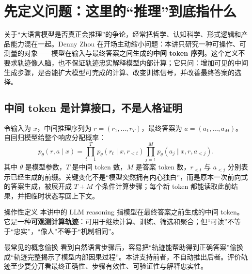 \section{先定义问题：这里的“推理”到底指什么}

关于“大语言模型是否真正会推理”的争论，经常把哲学、认知科学、形式逻辑和产品能力混在一起。Denny Zhou 在开场主动缩小问题：本讲只研究一种可操作、可测量的对象——模型在输入与最终答案之间生成的\textbf{中间 token 序列}。这个定义不要求轨迹像人脑，也不保证轨迹忠实解释模型内部计算；它只问：增加可见的中间生成步骤，是否能扩大模型可完成的计算、改变训练信号，并改善最终答案的选择。



\subsection{中间 token 是计算接口，不是人格证明}

令输入为 $x$，中间推理序列为 $r=(r_1,\ldots,r_T)$，最终答案为 $a=(a_1,\ldots,a_M)$。自回归模型给整个响应分配概率：
\[
p_\theta(r,a\mid x)
=\prod_{t=1}^{T}p_\theta(r_t\mid x,r_{<t})
 \prod_{j=1}^{M}p_\theta(a_j\mid x,r,a_{<j}).
\]
其中 $\theta$ 是模型参数，$T$ 是中间 token 数，$M$ 是答案 token 数，$r_{<t}$ 与 $a_{<j}$ 分别表示已经生成的前缀。关键变化不是“模型突然拥有内心独白”，而是原本一次前向式的答案生成，被展开成 $T+M$ 个条件计算步骤；每个新 token 都能读取此前结果，并把临时状态写回上下文。


\begin{importantbox}{操作性定义}
本讲中的 LLM reasoning 指模型在最终答案之前生成的中间 token。它是一种\textbf{可观测计算轨迹}：可用于继续计算、训练、筛选和聚合；但“可读”不等于“忠实”，“像人”不等于“机制相同”。
\end{importantbox}

\begin{warningbox}{最常见的概念偷换}
看到自然语言步骤后，容易把“轨迹能帮助得到正确答案”偷换成“轨迹完整揭示了模型内部因果过程”。本讲支持前者，不自动推出后者。评价轨迹至少要分开看最终正确性、步骤有效性、可验证性与解释忠实性。
\end{warningbox}

